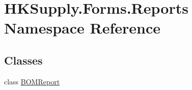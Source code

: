 \hypertarget{namespace_h_k_supply_1_1_forms_1_1_reports}{}\section{H\+K\+Supply.\+Forms.\+Reports Namespace Reference}
\label{namespace_h_k_supply_1_1_forms_1_1_reports}
\subsection*{Classes}
\begin{DoxyCompactItemize}
\item 
class \mbox{\hyperlink{class_h_k_supply_1_1_forms_1_1_reports_1_1_b_o_m_report}{B\+O\+M\+Report}}
\end{DoxyCompactItemize}
